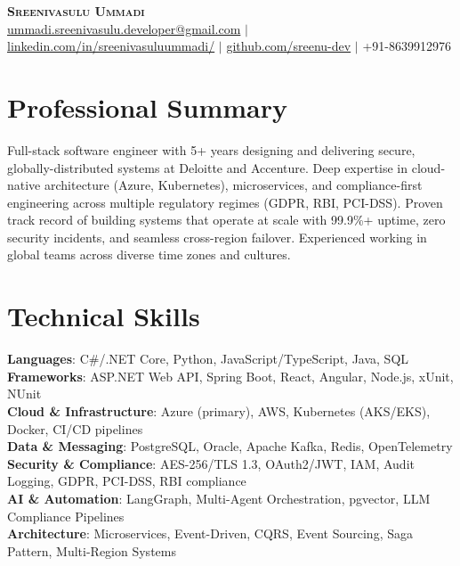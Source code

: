 \documentclass[letterpaper,11pt]{article}
\begin{document}
\begin{center}
    \textbf{\Huge \scshape Sreenivasulu Ummadi} \\ \vspace{5pt}
    \small \href{mailto:ummadi.sreenivasulu.developer@gmail.com}{ummadi.sreenivasulu.developer@gmail.com} $|$
    \href{https://www.linkedin.com/in/sreenivasuluummadi/}{linkedin.com/in/sreenivasuluummadi/} $|$
    \href{https://github.com/sreenu-dev}{github.com/sreenu-dev} $|$
    \small +91-8639912976
\end{center}

\section{Professional Summary}
\small{Full-stack software engineer with 5+ years designing and delivering secure, globally-distributed systems at Deloitte and Accenture. Deep expertise in cloud-native architecture (Azure, Kubernetes), microservices, and compliance-first engineering across multiple regulatory regimes (GDPR, RBI, PCI-DSS). Proven track record of building systems that operate at scale with 99.9\%+ uptime, zero security incidents, and seamless cross-region failover. Experienced working in global teams across diverse time zones and cultures.}

\section{Technical Skills}
 \begin{itemize}[leftmargin=0.15in, label={}]
    \small{\item{
     \textbf{Languages}{: C\#/.NET Core, Python, JavaScript/TypeScript, Java, SQL} \\
     \textbf{Frameworks}{: ASP.NET Web API, Spring Boot, React, Angular, Node.js, xUnit, NUnit} \\
     \textbf{Cloud \& Infrastructure}{: Azure (primary), AWS, Kubernetes (AKS/EKS), Docker, CI/CD pipelines} \\
     \textbf{Data \& Messaging}{: PostgreSQL, Oracle, Apache Kafka, Redis, OpenTelemetry} \\
     \textbf{Security \& Compliance}{: AES-256/TLS 1.3, OAuth2/JWT, IAM, Audit Logging, GDPR, PCI-DSS, RBI compliance} \\
     \textbf{AI \& Automation}{: LangGraph, Multi-Agent Orchestration, pgvector, LLM Compliance Pipelines} \\
     \textbf{Architecture}{: Microservices, Event-Driven, CQRS, Event Sourcing, Saga Pattern, Multi-Region Systems}
    }}
 \end{itemize}
\end{document}
